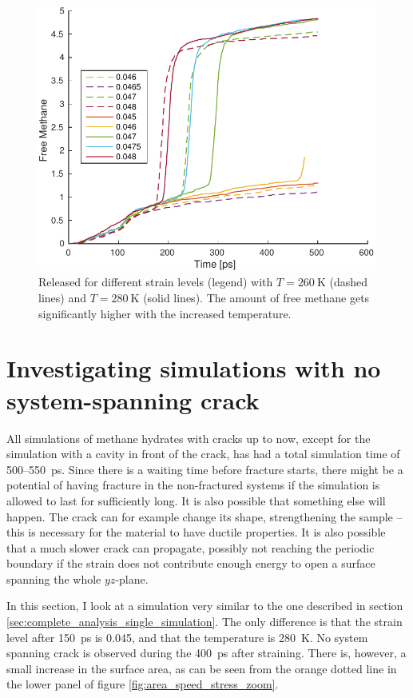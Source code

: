 \begin{figure}
\centering
\includegraphics[width=12cm]{../figures/thesis/released_methane_temp.pdf}
\caption{Released for different strain levels (legend) with $T = \SI{260}{\kelvin}$ (dashed lines) and $T = \SI{280}{\kelvin}$ (solid lines). The amount of free methane gets significantly higher with the increased temperature.}
\label{fig:released_methane_temp}
\end{figure}



\section{Investigating simulations with no system-spanning crack}
All simulations of methane hydrates with cracks up to now, except for the simulation with a cavity in front of the crack, has had a total simulation time of 500--\SI{550}{\pico\second}. Since there is a waiting time before fracture starts, there might be a potential of having fracture in the non-fractured systems if the simulation is allowed to last for sufficiently long. It is also possible that something else will happen. The crack can for example change its shape, strengthening the sample -- this is necessary for the material to have ductile properties. It is also possible that a much slower crack can propagate, possibly not reaching the periodic boundary if the strain does not contribute enough energy to open a surface spanning the whole $yz$-plane. 

In this section, I look at a simulation very similar to the one described in section \ref{sec:complete_analysis_single_simulation}. The only difference is that the strain level after \SI{150}{\pico\second} is 0.045, and that the temperature is \SI{280}{\kelvin}. No system spanning crack is observed during the \SI{400}{\pico\second} after straining. There is, however, a small increase in the surface area, as can be seen from the orange dotted line in the lower panel of figure \ref{fig:area_speed_stress_zoom}.

